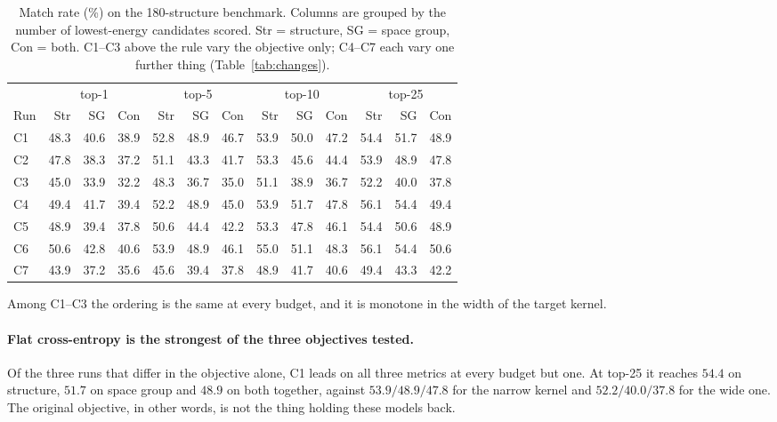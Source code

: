 \documentclass[manuscript,screen,review]{acmart}
\begin{document}
\begin{table}[h]
  \caption{Match rate (\%) on the 180-structure benchmark. Columns are grouped
  by the number of lowest-energy candidates scored. Str = structure,
  SG = space group, Con = both. C1--C3 above the rule vary the objective only;
  C4--C7 each vary one further thing (Table~\ref{tab:changes}).}
  \label{tab:completed}
  \begin{footnotesize}
  \begin{tabular}{lrrrrrrrrrrrr}
    \toprule
    & \multicolumn{3}{c}{top-1} & \multicolumn{3}{c}{top-5}
    & \multicolumn{3}{c}{top-10} & \multicolumn{3}{c}{top-25} \\
    \cmidrule(lr){2-4}\cmidrule(lr){5-7}\cmidrule(lr){8-10}\cmidrule(lr){11-13}
    Run & Str & SG & Con & Str & SG & Con & Str & SG & Con & Str & SG & Con \\
    \midrule
    C1 & 48.3 & 40.6 & 38.9 & 52.8 & 48.9 & 46.7 & 53.9 & 50.0 & 47.2 & 54.4 & 51.7 & 48.9 \\
    C2 & 47.8 & 38.3 & 37.2 & 51.1 & 43.3 & 41.7 & 53.3 & 45.6 & 44.4 & 53.9 & 48.9 & 47.8 \\
    C3 & 45.0 & 33.9 & 32.2 & 48.3 & 36.7 & 35.0 & 51.1 & 38.9 & 36.7 & 52.2 & 40.0 & 37.8 \\
    \midrule
    C4 & 49.4 & 41.7 & 39.4 & 52.2 & 48.9 & 45.0 & 53.9 & 51.7 & 47.8 & 56.1 & 54.4 & 49.4 \\
    C5 & 48.9 & 39.4 & 37.8 & 50.6 & 44.4 & 42.2 & 53.3 & 47.8 & 46.1 & 54.4 & 50.6 & 48.9 \\
    C6 & 50.6 & 42.8 & 40.6 & 53.9 & 48.9 & 46.1 & 55.0 & 51.1 & 48.3 & 56.1 & 54.4 & 50.6 \\
    C7 & 43.9 & 37.2 & 35.6 & 45.6 & 39.4 & 37.8 & 48.9 & 41.7 & 40.6 & 49.4 & 43.3 & 42.2 \\
    \bottomrule
  \end{tabular}
  \end{footnotesize}
\end{table}

Among C1--C3 the ordering is the same at every budget, and it is monotone in
the width of the target kernel.

\paragraph{Flat cross-entropy is the strongest of the three objectives tested.}
Of the three runs that differ in the objective alone, C1 leads on all three
metrics at every budget but one. At top-25 it reaches
$54.4$ on structure, $51.7$ on space group and $48.9$ on both together, against
$53.9 / 48.9 / 47.8$ for the narrow kernel and $52.2 / 40.0 / 37.8$ for the wide
one. The original objective, in other words, is not the thing holding these
models back.
\end{document}
